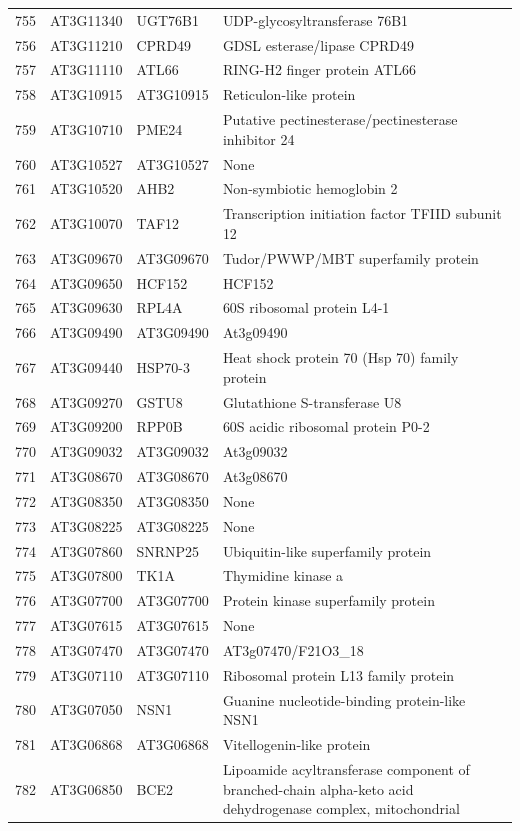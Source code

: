 \documentclass[11pt]{article}
\begin{document}
\begin{center}
\begin{tabular}{rlll}
755 & AT3G11340 & UGT76B1 & UDP-glycosyltransferase 76B1\\
756 & AT3G11210 & CPRD49 & GDSL esterase/lipase CPRD49\\
757 & AT3G11110 & ATL66 & RING-H2 finger protein ATL66\\
758 & AT3G10915 & AT3G10915 & Reticulon-like protein\\
759 & AT3G10710 & PME24 & Putative pectinesterase/pectinesterase inhibitor 24\\
760 & AT3G10527 & AT3G10527 & None\\
761 & AT3G10520 & AHB2 & Non-symbiotic hemoglobin 2\\
762 & AT3G10070 & TAF12 & Transcription initiation factor TFIID subunit 12\\
763 & AT3G09670 & AT3G09670 & Tudor/PWWP/MBT superfamily protein\\
764 & AT3G09650 & HCF152 & HCF152\\
765 & AT3G09630 & RPL4A & 60S ribosomal protein L4-1\\
766 & AT3G09490 & AT3G09490 & At3g09490\\
767 & AT3G09440 & HSP70-3 & Heat shock protein 70 (Hsp 70) family protein\\
768 & AT3G09270 & GSTU8 & Glutathione S-transferase U8\\
769 & AT3G09200 & RPP0B & 60S acidic ribosomal protein P0-2\\
770 & AT3G09032 & AT3G09032 & At3g09032\\
771 & AT3G08670 & AT3G08670 & At3g08670\\
772 & AT3G08350 & AT3G08350 & None\\
773 & AT3G08225 & AT3G08225 & None\\
774 & AT3G07860 & SNRNP25 & Ubiquitin-like superfamily protein\\
775 & AT3G07800 & TK1A & Thymidine kinase a\\
776 & AT3G07700 & AT3G07700 & Protein kinase superfamily protein\\
777 & AT3G07615 & AT3G07615 & None\\
778 & AT3G07470 & AT3G07470 & AT3g07470/F21O3\_18\\
779 & AT3G07110 & AT3G07110 & Ribosomal protein L13 family protein\\
780 & AT3G07050 & NSN1 & Guanine nucleotide-binding protein-like NSN1\\
781 & AT3G06868 & AT3G06868 & Vitellogenin-like protein\\
782 & AT3G06850 & BCE2 & Lipoamide acyltransferase component of branched-chain alpha-keto acid dehydrogenase complex, mitochondrial\\

\end{tabular}
\end{center}
\end{document}
